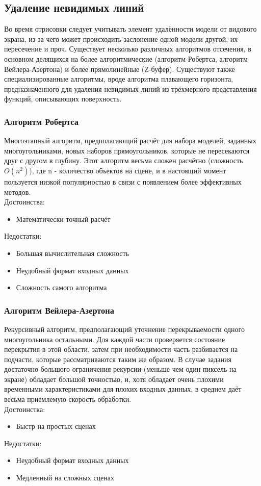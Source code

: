 \documentclass[a4paper,12pt]{report}
\numberwithin{equation}{section}
\begin{document}
\subsection{Удаление невидимых линий}
Во время отрисовки следует учитывать элемент удалённости модели от видового экрана, из-за чего может происходить заслонение одной модели другой, их пересечение и проч. Существует несколько различных алгоритмов отсечения, в основном делящихся на более алгоритмические (алгоритм Робертса, алгоритм Вейлера-Азертона) и более прямолинейные (Z-буфер). Существуют также специализированные алгоритмы, вроде алгоритма плавающего горизонта, предназначенного для удаления невидимых линий из трёхмерного представления функций, описывающих поверхность.

\subsubsection*{Алгоритм Робертса}
Многоэтапный алгоритм, предполагающий расчёт для набора моделей, заданных многоугольниками, новых наборов прямоугольников, которые не пересекаются друг с другом в глубину. Этот алгоритм весьма сложен расчётно (сложность $O(n^2)$), где n - количество объектов на сцене, и в настоящий момент пользуется низкой популярностью в связи с появлением более эффективных методов. \\
Достоинства:
\begin{itemize}
\item Математически точный расчёт
\end{itemize}
Недостатки:
\begin{itemize}
\item Большая вычислительная сложность
\item Неудобный формат входных данных
\item Сложность самого алгоритма
\end{itemize}

\subsubsection*{Алгоритм Вейлера-Азертона}
Рекурсивный алгоритм, предполагающий уточнение перекрываемости одного многоугольника остальными. Для каждой части проверяется состояние перекрытия в этой области, затем при необходимости часть разбивается на подчасти, которые рассматриваются таким же образом. В случае задания достаточно большого ограничения рекурсии (меньше чем один пиксель на экране) обладает большой точностью, и, хотя обладает очень плохими временными характеристиками для плохих входных данных, в среднем даёт весьма приемлемую скорость обработки. \\
Достоинстка:
\begin{itemize}
\item Быстр на простых сценах
\end{itemize}
Недостатки:
\begin{itemize}
\item Неудобный формат входных данных
\item Медленный на сложных сценах
\end{itemize}
\end{document}
